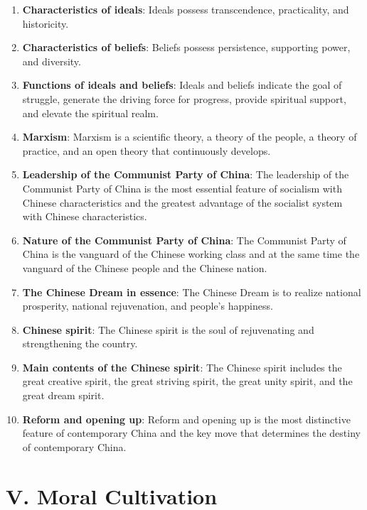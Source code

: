 \documentclass[11pt,a4paper]{ctexart}
\begin{document}
\begin{enumerate}[leftmargin=2em]
    \item \textbf{Characteristics of ideals}: Ideals possess transcendence, practicality, and historicity.
    \item \textbf{Characteristics of beliefs}: Beliefs possess persistence, supporting power, and diversity.
    \item \textbf{Functions of ideals and beliefs}: Ideals and beliefs indicate the goal of struggle, generate the driving force for progress, provide spiritual support, and elevate the spiritual realm.
    \item \textbf{Marxism}: Marxism is a scientific theory, a theory of the people, a theory of practice, and an open theory that continuously develops.
    \item \textbf{Leadership of the Communist Party of China}: The leadership of the Communist Party of China is the most essential feature of socialism with Chinese characteristics and the greatest advantage of the socialist system with Chinese characteristics.
    \item \textbf{Nature of the Communist Party of China}: The Communist Party of China is the vanguard of the Chinese working class and at the same time the vanguard of the Chinese people and the Chinese nation.
    \item \textbf{The Chinese Dream in essence}: The Chinese Dream is to realize national prosperity, national rejuvenation, and people's happiness.
    \item \textbf{Chinese spirit}: The Chinese spirit is the soul of rejuvenating and strengthening the country.
    \item \textbf{Main contents of the Chinese spirit}: The Chinese spirit includes the great creative spirit, the great striving spirit, the great unity spirit, and the great dream spirit.
    \item \textbf{Reform and opening up}: Reform and opening up is the most distinctive feature of contemporary China and the key move that determines the destiny of contemporary China.
\end{enumerate}

\section{V. Moral Cultivation}
\end{document}
